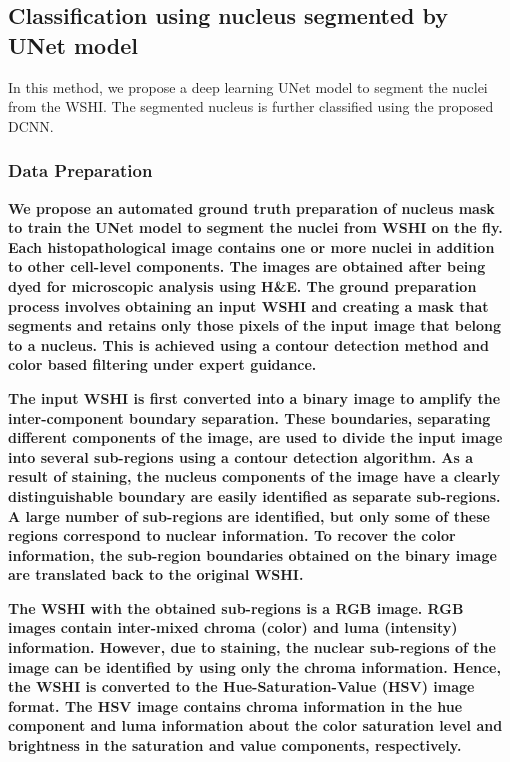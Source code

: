 \documentclass{comjnl}
\begin{document}
\subsection{Classification using nucleus segmented by UNet model}

In this method, we propose a deep learning UNet model to segment the nuclei from the WSHI. The segmented nucleus is further classified using the proposed DCNN.

\subsubsection{Data Preparation}
\textbf{
We propose an automated ground truth preparation of nucleus mask to train the UNet model to segment the nuclei from WSHI on the fly. Each histopathological image contains one or more nuclei in addition to other cell-level components. The images are obtained after being dyed for microscopic analysis using H&E. The  ground preparation process involves obtaining an input WSHI and creating a mask that segments and retains only those pixels of the input image that belong to a nucleus. This is achieved using a contour detection method and color based filtering under expert guidance.}

\textbf{
The input WSHI is first converted into a binary image to amplify the inter-component boundary separation. These boundaries, separating different components of the image, are used to divide the input image into several sub-regions using a contour detection algorithm. As a result of staining, the nucleus components of the image have a clearly distinguishable boundary are easily identified as separate sub-regions. A large number of sub-regions are identified, but only some of these regions correspond to nuclear information. To recover the color information, the sub-region boundaries obtained on the binary image are translated back to the original WSHI. 
}

\textbf{
The WSHI with the obtained sub-regions is a RGB image. RGB images contain inter-mixed chroma (color) and luma (intensity) information. However, due to staining, the nuclear sub-regions of the image can be identified by using only the chroma information. Hence, the WSHI is converted to the Hue-Saturation-Value (HSV) image format. The HSV image contains chroma information in the hue component and luma information about the color saturation level and brightness in the saturation and value components, respectively.
}
\end{document}
